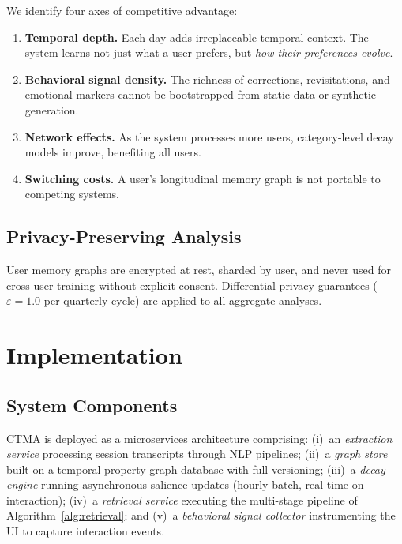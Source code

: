 \documentclass[11pt,a4paper]{article}
\begin{document}
We identify four axes of competitive advantage:

\begin{enumerate}[label=(\arabic*)]
  \item \textbf{Temporal depth.} Each day adds irreplaceable temporal context. The system learns not just what a user prefers, but \textit{how their preferences evolve}.
  \item \textbf{Behavioral signal density.} The richness of corrections, revisitations, and emotional markers cannot be bootstrapped from static data or synthetic generation.
  \item \textbf{Network effects.} As the system processes more users, category-level decay models improve, benefiting all users.
  \item \textbf{Switching costs.} A user's longitudinal memory graph is not portable to competing systems.
\end{enumerate}

\subsection{Privacy-Preserving Analysis}

User memory graphs are encrypted at rest, sharded by user, and never used for cross-user training without explicit consent. Differential privacy guarantees ($\varepsilon = 1.0$ per quarterly cycle) are applied to all aggregate analyses.


\section{Implementation}
\label{sec:implementation}

\subsection{System Components}

CTMA is deployed as a microservices architecture comprising: (i)~an \textit{extraction service} processing session transcripts through NLP pipelines; (ii)~a \textit{graph store} built on a temporal property graph database with full versioning; (iii)~a \textit{decay engine} running asynchronous salience updates (hourly batch, real-time on interaction); (iv)~a \textit{retrieval service} executing the multi-stage pipeline of Algorithm~\ref{alg:retrieval}; and (v)~a \textit{behavioral signal collector} instrumenting the UI to capture interaction events.
\end{document}
